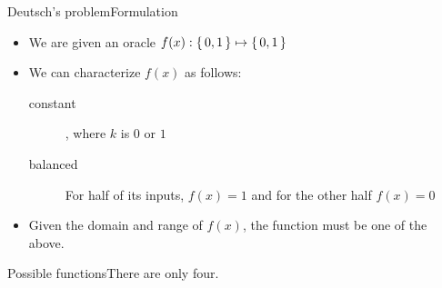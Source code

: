 
\begin{frame}{Deutsch's problem}{Formulation}

\begin{itemize}
    \item We are given an oracle $f(x): \left\{\,0,1\,\right\} \mapsto \left\{\,0,1\,\right\}$
    \item We can characterize $f(x)$ as follows:
    \begin{description}
        \item[constant]   , where $k$ is $0$ or $1$
        \item[balanced]   For half of its inputs, $f(x)=1$ and for the other half $f(x)=0$
    \end{description}
    \item Given the domain and range of $f(x)$, the function must be one of the above.
\end{itemize}
    
\end{frame}

\begin{frame}{Possible functions}{There are only four.}

    
\end{frame}


